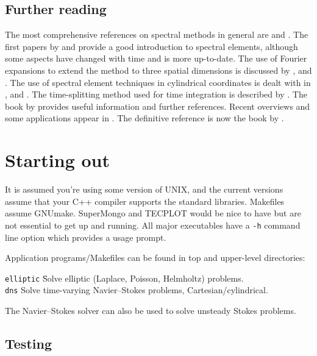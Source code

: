 \documentclass[11pt,a4paper]{report}
\begin{document}
\section{Further reading}

The most comprehensive references on spectral methods in general are
\citet{gs77} and \citet{chqz88}.  The first papers by \citet{pat84}
and \citet{kp86} provide a good introduction to spectral elements,
although some aspects have changed with time and \citet{mt89} is more
up-to-date.  The use of Fourier expansions to extend the method to
three spatial dimensions is discussed by \citet{ap89}, \citet{kar89}
and \citet{kar90}.  The use of spectral element techniques in
cylindrical coordinates is dealt with in \citet{tok93},
\citet{tomors00} and \citet{bllo02}.  The
time-splitting method used for time integration is described by
\citet{kio91}.  The book by \citet{fun97} provides useful information
and further references.  Recent overviews and some applications appear
in \citet{kh98,hen99b}.  The definitive reference is now the book by
\citet{kars99}.

\chapter{Starting out}

It is assumed you're using some version of UNIX, and the current
versions assume that your C++ compiler supports the standard
libraries. Makefiles assume GNUmake.  SuperMongo and TECPLOT would be
nice to have but are not essential to get up and running.  All major
executables have a \texttt{-h} command line option which provides a
usage prompt.

Application programs/Makefiles can be found in top and upper-level
directories:
\begin{tabbing}
\texttt{elliptic}    \= 
        Solve elliptic (Laplace, Poisson, Helmholtz) problems.\\
\texttt{dns} \>
        Solve time-varying Navier--Stokes problems, Cartesian/cylindrical.\\
\end{tabbing}
The Navier--Stokes solver can also be used to solve unsteady Stokes
problems.

\section{Testing}
\end{document}
